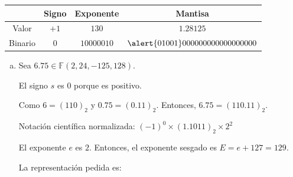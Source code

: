 \begin{frame}
\begin{solution}
\begin{enumerate}[a)]
			      \begin{table}[ht!]
				      \begin{tabular}{c|c|c|c}
					              & Signo & Exponente  & Mantisa                           \\
					      \hline
					      Valor   & $+1$  & $ 130 $    & $1.28125$                         \\
					      \hline
					      Binario & $0$   & $10000010$ & $\alert{01001}000000000000000000$
				      \end{tabular}
			      \end{table}
		\end{enumerate}
	\end{solution}
\end{frame}

\begin{frame}
	\begin{solution}
		\begin{enumerate}[b)]
			\item

			      Sea
			      \begin{math}
				      6.75\in\mathbb{F}\left(2,24,-125,128\right)
			      \end{math}.

			      El signo $s$ es $0$ porque es positivo.

			      Como
			      \begin{math}
				      6=
				      {\left(110\right)}_{2}
			      \end{math}
			      y
			      \begin{math}
				      0.75=
				      {\left(0.11\right)}_{2}
			      \end{math}.
			      Entonces,
			      \begin{math}
				      6.75=
				      {\left(110.11\right)}_{2}
			      \end{math}.

			      Notación científica normalizada:
			      \begin{math}
				      {\left(-1\right)}^{0}\times
				      \left(1.1011\right)_{2}
				      \times 2^{2}
			      \end{math}

			      El exponente $e$ es $2$.
			      Entonces, el exponente sesgado es
			      \begin{math}
				      E=
				      e+127=129
			      \end{math}.

			      La representación pedida es:


\end{enumerate}
\end{solution}
\end{frame}
